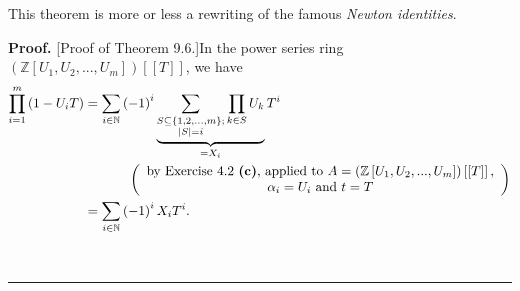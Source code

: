 \documentclass[numbers=enddot,12pt,final,onecolumn,notitlepage]{scrartcl}%
\newenvironment{proof}[1][Proof]{\noindent\textbf{#1.} }{\ \rule{0.5em}{0.5em}}
\begin{document}
This theorem is more or less a rewriting of the famous \textit{Newton
identities}.

\begin{proof}
[Proof of Theorem 9.6.]In the power series ring $\left(  \mathbb{Z}\left[
U_{1},U_{2},...,U_{m}\right]  \right)  \left[  \left[  T\right]  \right]  $,
we have%
\begin{align}
\prod\limits_{i=1}^{m}\left(  1-U_{i}T\right)   &  =\sum_{i\in\mathbb{N}%
}\left(  -1\right)  ^{i}\underbrace{\sum_{\substack{S\subseteq\left\{
1,2,...,m\right\}  ;\\\left\vert S\right\vert =i}}\prod\limits_{k\in S}U_{k}%
}_{=X_{i}}T^{i}\nonumber\\
&  \ \ \ \ \ \ \ \ \ \ \left(
\begin{array}
[c]{c}%
\text{by Exercise 4.2 \textbf{(c)}, applied to }A=\left(  \mathbb{Z}\left[
U_{1},U_{2},...,U_{m}\right]  \right)  \left[  \left[  T\right]  \right]
\text{,}\\
\alpha_{i}=U_{i}\text{ and }t=T
\end{array}
\right) \nonumber\\
&  =\sum_{i\in\mathbb{N}}\left(  -1\right)  ^{i}X_{i}T^{i}. \label{9.6.pf0}%
\end{align}



\end{proof}
\end{document}
